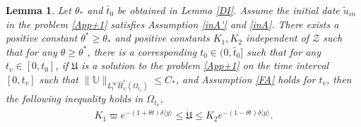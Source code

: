 \documentclass{amsart}
\numberwithin{equation}{section}
\newtheorem{lemma}{Lemma}[section]
\newcommand\y{{{\langle y \rangle}}}
\begin{document}
\begin{lemma}\label{wdotu}
Let $\theta_{*}$ and $\bar{t}_{0}$ be obtained in Lemma \ref{DI}.
Assume the initial date $\tilde{u}_{in}$ in the problem \eqref{App+1} satisfies Assumption \ref{inA'} and \ref{inA}.
There exists a positive constant $\theta^{*}\geq \theta_{*}$ and positive constants $K_{1},K_{2}$ independent of $\mathcal{Z}$ such that for any $\theta\geq\theta^{*}$, there is a corresponding $t_{0}\in(0,\bar{t}_{0}]$ such that for any $t_{v}\in[0,t_{0}]$, if $\mathfrak{U}$ is a solution to the problem \eqref{App+1} on the time interval $[0,t_{v}]$ such that
$\|\mathbb{U}\|_{L_{t}^{\infty}\hat{H}_{\psi}^{s}(\Omega_{t_{v}})}\leq C_{*}$,
and Assumption \ref{FA} holds for $t_{v}$, then the following inequality holds in $\Omega_{t_{v}}$,
\begin{align}\label{dotu}
K_{1}\varpi e^{-(1+\theta t)\delta\y}\leq \dot{\mathfrak{U}}\leq K_{2}e^{-(1-\theta t)\delta\y}.
\end{align}
\end{lemma}
\end{document}

